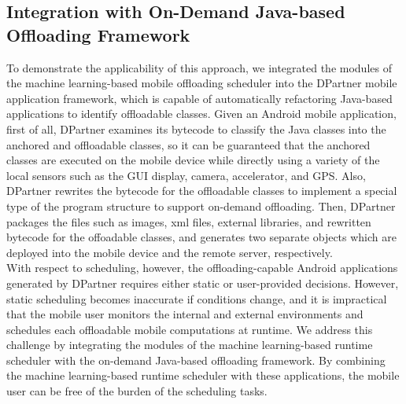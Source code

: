 \documentclass[10pt, conference, compsocconf]{IEEEtran}
\begin{document}
{\subsection{Integration with On-Demand Java-based Offloading Framework}
%
To demonstrate the applicability of this approach, we integrated the modules of the
machine learning-based mobile offloading scheduler into the DPartner 
mobile application framework, which is capable of automatically refactoring
Java-based applications to identify offloadable classes.
%
Given an Android mobile application, first of all, DPartner examines its
bytecode to classify the Java classes into the anchored and offloadable
classes, so it can be guaranteed that the anchored classes are executed
on the mobile device while directly using a variety of the local sensors
such as the GUI display, camera, accelerator, and GPS.
%
Also, DPartner rewrites the bytecode for the offloadable classes to
implement a special type of the program structure to support on-demand
offloading.
%
Then, DPartner packages the files such as images, xml files, external
libraries, and rewritten bytecode for the offoadable classes, and
generates two separate objects which are deployed into the mobile device
and the remote server, respectively.\\
%
\indent With respect to scheduling, however, the offloading-capable
Android applications generated by DPartner requires either static or
user-provided decisions. 
%
However, static scheduling becomes inaccurate if conditions change, and it is impractical that the
mobile user monitors the internal and external environments and
schedules each offloadable mobile computations at runtime.
We address this challenge by integrating the modules of
the machine learning-based runtime scheduler with the on-demand
Java-based offloading framework.  
%
By combining the machine learning-based runtime scheduler with these
applications, the mobile user can be free of the burden of the scheduling
tasks.
%
}
\end{document}
